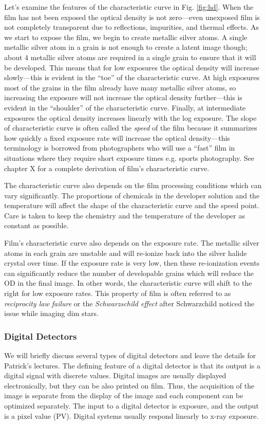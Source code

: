 \documentclass[mphy386-notes.tex]{subfiles}
\begin{document}
Let's examine the features of the characteristic curve in Fig. \ref{fig:hd}.
When the film has not been exposed the optical density is not zero---even
unexposed film is not completely transparent due to reflections, impurities, and
thermal effects. As we start to expose the film, we begin to create metallic
silver atoms. A single metallic silver atom in a grain is not enough to create a
latent image though; about 4 metallic silver atoms are required in a single
grain to ensure that it will be developed. This means that for low exposures the
optical density will increase slowly---this is evident in the ``toe'' of the
characteristic curve. At high exposures most of the grains in the film already
have many metallic silver atoms, so increasing the exposure will not increase
the optical density further---this is evident in the ``shoulder'' of the
characteristic curve. Finally, at intermediate exposures the optical density
increases linearly with the log exposure. The slope of characteristic curve is
often called the \textit{speed} of the film because it summarizes how quickly a
fixed exposure rate will increase the optical density---this terminology is
borrowed from photographers who will use a ``fast'' film in situations where
they require short exposure times e.g. sports photography. See \cite{barrett}
chapter X for a complete derivation of film's characteristic curve.

The characteristic curve also depends on the film processing conditions which
can vary significantly. The proportions of chemicals in the developer solution
and the temperature will affect the shape of the characteristic curve and the
speed point. Care is taken to keep the chemistry and the temperature of the
developer as constant as possible.

Film's characteristic curve also depends on the exposure rate. The metallic
silver atoms in each grain are unstable and will re-ionize back into the silver
halide crystal over time. If the exposure rate is very low, then these
re-ionization events can significantly reduce the number of developable grains
which will reduce the OD in the final image. In other words, the characteristic
curve will shift to the right for low exposure rates. This property of film is
often referred to as \textit{reciprocity law failure} or the
\textit{Schwarzschild effect} after Schwarzchild noticed the issue while imaging
dim stars.

\subsubsection*{Digital Detectors}
We will briefly discuss several types of digital detectors and leave the details
for Patrick's lectures. The defining feature of a digital detector is that its
output is a digital signal with discrete values. Digital images are usually
displayed electronically, but they can be also printed on film. Thus, the
acquisition of the image is separate from the display of the image and each
component can be optimized separately. The input to a digital detector is
exposure, and the output is a pixel value (PV). Digital systems usually respond
linearly to x-ray exposure.
\end{document}
